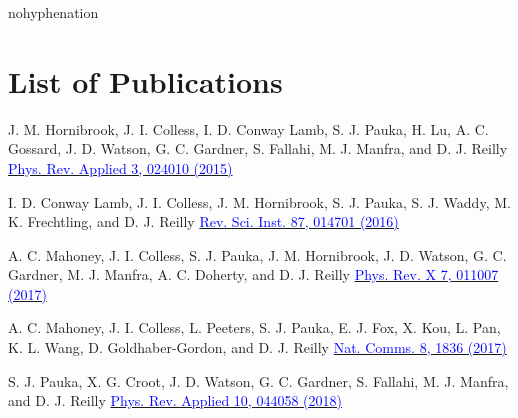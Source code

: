 \begin{hyphenrules}{nohyphenation}
  \begin{sloppypar}
    \tableofcontents
    \newpage
    \listoffigures
    \newpage
    \listoftables
    \newpage
    \chapter*{List of Publications}
      \makeatletter
      \let\old@parskip=\parskip
      \setlength{\parskip}{2em}
      \makeatother

      {J. M. Hornibrook, J. I. Colless, I. D. Conway Lamb, S. J. Pauka, H. Lu, A. C. Gossard, J. D. Watson, G. C. Gardner, S. Fallahi, M. J. Manfra, and D. J. Reilly}
      {\href{https://doi.org/\detokenize{10.1103/PhysRevApplied.3.024010}}{\textcolor{blue}{Phys. Rev. Applied 3, 024010 (2015)}}}

      {I. D. Conway Lamb, J. I. Colless, J. M. Hornibrook, S. J. Pauka, S. J. Waddy, M. K. Frechtling, and D. J. Reilly}
      {\href{https://doi.org/\detokenize{10.1063/1.4939094}}{\textcolor{blue}{Rev. Sci. Inst. 87, 014701 (2016)}}}

      {A. C. Mahoney, J. I. Colless, S. J. Pauka, J. M. Hornibrook, J. D. Watson, G. C. Gardner, M. J. Manfra, A. C. Doherty, and D. J. Reilly}
      {\href{https://doi.org/\detokenize{10.1103/PhysRevX.7.011007}}{\textcolor{blue}{Phys. Rev. X 7, 011007 (2017)}}}

      {A. C. Mahoney, J. I. Colless, L. Peeters, S. J. Pauka, E. J. Fox, X. Kou, L. Pan, K. L. Wang, D. Goldhaber-Gordon, and D. J. Reilly}
      {\href{https://doi.org/\detokenize{10.1038/s41467-017-01984-5}}{\textcolor{blue}{Nat. Comms. 8, 1836 (2017)}}}

      {S. J. Pauka, X. G. Croot, J. D. Watson, G. C. Gardner, S. Fallahi, M. J. Manfra, and D. J. Reilly}
      {\href{https://doi.org/\detokenize{10.1103/PhysRevApplied.10.044058}}{\textcolor{blue}{Phys. Rev. Applied 10, 044058 (2018)}}}


\end{sloppypar}
\end{hyphenrules}
